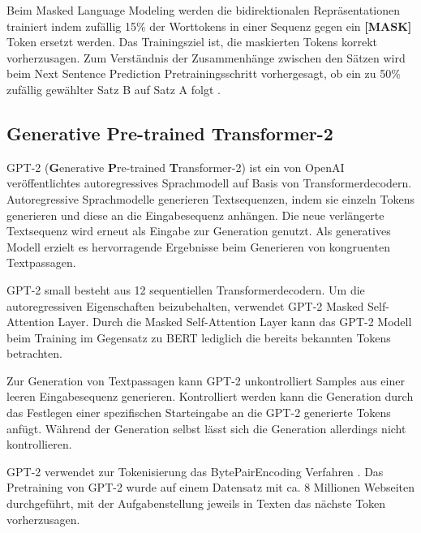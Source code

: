 Beim Masked Language Modeling werden die bidirektionalen Repräsentationen trainiert indem zufällig 15\% der Worttokens in einer Sequenz gegen ein \textbf{[MASK]} Token ersetzt werden. Das Trainingsziel ist, die maskierten Tokens korrekt vorherzusagen.
Zum Verständnis der Zusammenhänge zwischen den Sätzen wird beim Next Sentence Prediction Pretrainingsschritt vorhergesagt, ob ein zu 50\% zufällig gewählter Satz B auf Satz A folgt \citep{DBLP:journals/corr/abs-1810-04805}.

\pagebreak
\subsection{\textbf{G}enerative \textbf{P}re-trained \textbf{T}ransformer-2}
GPT-2 (\textbf{G}enerative \textbf{P}re-trained \textbf{T}ransformer-2) ist ein von OpenAI \citep{radford2019language} veröffentlichtes autoregressives Sprachmodell auf Basis von Transformerdecodern.
Autoregressive Sprachmodelle generieren Textsequenzen, indem sie einzeln Tokens generieren und diese an die Eingabesequenz anhängen. Die neue verlängerte Textsequenz wird erneut als Eingabe zur Generation genutzt.
Als generatives Modell erzielt es hervorragende Ergebnisse beim Generieren von kongruenten Textpassagen.

GPT-2 small besteht aus 12 sequentiellen Transformerdecodern.
Um die autoregressiven Eigenschaften beizubehalten, verwendet GPT-2 Masked Self-Attention Layer. 
Durch die Masked Self-Attention Layer kann das GPT-2 Modell beim Training im Gegensatz zu BERT lediglich die bereits bekannten Tokens betrachten.

Zur Generation von Textpassagen kann GPT-2 unkontrolliert Samples aus einer leeren Eingabesequenz generieren.
Kontrolliert werden kann die Generation durch das Festlegen einer spezifischen Starteingabe an die GPT-2 generierte Tokens anfügt.
Während der Generation selbst lässt sich die Generation allerdings nicht kontrollieren.

GPT-2 verwendet zur Tokenisierung das BytePairEncoding Verfahren \citep{bytepairencoding}.
Das Pretraining von GPT-2 wurde auf einem Datensatz mit ca. 8 Millionen Webseiten durchgeführt, mit der Aufgabenstellung jeweils in Texten das nächste Token vorherzusagen.



\pagebreak

